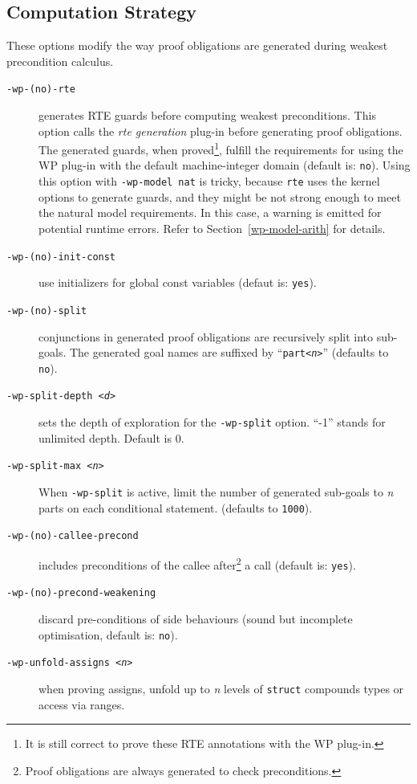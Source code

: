 \subsection{Computation Strategy}

These options modify the way proof obligations are generated during
weakest precondition calculus.

\begin{description}
\item[\tt -wp-(no)-rte] generates RTE guards before computing weakest
  preconditions. This option calls the \emph{rte generation} plug-in
  before generating proof obligations.
  The generated guards, when proved\footnote{It is still correct to prove these RTE
    annotations with the \textsf{WP} plug-in.}, fulfill the requirements for
  using the \textsf{WP} plug-in with the default machine-integer domain (default is: \texttt{no}).
  Using this option with \texttt{-wp-model nat} is tricky, because \texttt{rte} uses the kernel options
  to generate guards, and they might be not strong enough to meet the natural model requirements.
  In this case, a warning is emitted for potential runtime errors.
  Refer to Section~\ref{wp-model-arith} for details.
\item[\tt -wp-(no)-init-const] use initializers for global const variables
  (defaut is: \texttt{yes}).
\item[\tt -wp-(no)-split] conjunctions in generated proof obligations are
  recursively split into sub-goals.  The generated goal names are
  suffixed by ``{\tt part<{\it n}>}'' (defaults to \texttt{no}).
\item[\tt -wp-split-depth <{\it d}>] sets the depth of exploration for the
  \texttt{-wp-split} option. ``-1'' stands for unlimited depth. Default is 0.
\item[\tt -wp-split-max <{\it n}>] When \verb+-wp-split+ is active,
  limit the number of generated sub-goals to \textit{n} parts on each conditional statement.
  (defaults to \verb+1000+).
\item[\tt -wp-(no)-callee-precond] includes preconditions of the callee
  after\footnote{Proof obligations are always generated to check preconditions.}
  a call (default is: \texttt{yes}).
\item[\tt -wp-(no)-precond-weakening] discard pre-conditions of side behaviours (sound but
  incomplete optimisation, default is: \texttt{no}).
\item[\tt -wp-unfold-assigns <{\it n}>] when proving assigns, unfold up to
  \textit{n} levels of \texttt{struct} compounds types or access via ranges.

\end{description}
